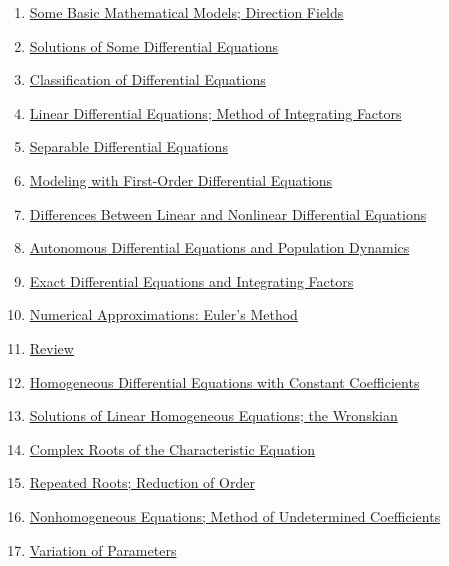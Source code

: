\documentclass[11pt]{article}
\begin{document}
\begin{enumerate}
	\item \href{https://mp.weixin.qq.com/s/5bwv5o5TYztyFd6a-0vm9g}{Some Basic Mathematical Models; Direction Fields}	%
	\item \href{https://mp.weixin.qq.com/s/HyiAMRhLg74sREppmiFzWA}{Solutions of Some Differential Equations}	%
	\item \href{https://mp.weixin.qq.com/s/qzKdePWahQuCaw7OadnkPg}{Classification of Differential Equations}	%
	\item \href{https://mp.weixin.qq.com/s/34xtMFwPoywHQ6F87U6quA}{Linear Differential Equations; Method of Integrating Factors}	%
	\item \href{https://mp.weixin.qq.com/s/S-0pIleIeCU5A6icX7uxIQ}{Separable Differential Equations}	%
	\item \href{https://mp.weixin.qq.com/s/0pm6-yOauFxJL05QuOuU2Q}{Modeling with First-Order Differential Equations}	%
	\item \href{https://mp.weixin.qq.com/s/rfN8YDzns6D9YLvKu_uVdQ}{Differences Between Linear and Nonlinear Differential Equations}	%
	\item \href{https://mp.weixin.qq.com/s/5JsKEgTVnrdYT3BMkfc7Zw}{Autonomous Differential Equations and Population Dynamics}	%
	\item \href{https://mp.weixin.qq.com/s/CkVfHwhRQ_ZrerBniskBXQ}{Exact Differential Equations and Integrating Factors}	%
	\item \href{https://mp.weixin.qq.com/s/blKefgzUdbI_haO4THcO2g}{Numerical Approximations: Euler's Method}	%
	\item \href{https://mp.weixin.qq.com/s/Uy-ef0hm14Ocu8txbXh1Rw}{Review}	%
	\item \href{https://mp.weixin.qq.com/s/9skywLTO1JWoXcfkKtxmwQ}{Homogeneous Differential Equations with Constant Coefficients}	%
	\item \href{https://mp.weixin.qq.com/s/YBVvOqCSc8wa7f0zdrdb5Q}{Solutions of Linear Homogeneous Equations; the Wronskian}	%
	\item \href{https://mp.weixin.qq.com/s/4GzrL4qrWXPxGX5XVzA44A}{Complex Roots of the Characteristic Equation}	%
	\item \href{https://mp.weixin.qq.com/s/9B91AJwBJBrxPPZ0yvGE6Q}{Repeated Roots; Reduction of Order}	%
	\item \href{https://mp.weixin.qq.com/s/UQ68oDd60RUM9INTx7mEBw}{Nonhomogeneous Equations; Method of Undetermined Coefficients}	%
	\item \href{https://mp.weixin.qq.com/s/P3xJLgQuq0165awp3CacQQ}{Variation of Parameters}	%

\end{enumerate}
\end{document}
